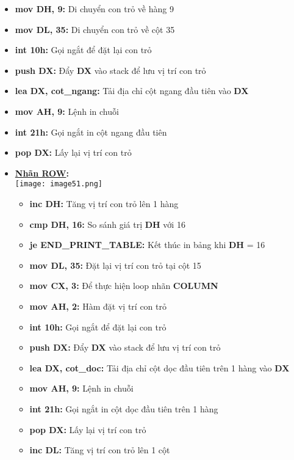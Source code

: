 \begin{itemize}
    \item \textbf{mov DH, 9:} Di chuyển con trỏ về hàng 9
    \item \textbf{mov DL, 35:} Di chuyển con trỏ về cột 35
    \item \textbf{int 10h:} Gọi ngắt để đặt lại con trỏ
    \item \textbf{push DX:} Đẩy \textbf{DX} vào stack để lưu vị trí con trỏ
    \item \textbf{lea DX, cot\_ngang:} Tải địa chỉ cột ngang đầu tiên vào \textbf{DX}
    \item \textbf{mov AH, 9:} Lệnh in chuỗi
    \item \textbf{int 21h:} Gọi ngắt in cột ngang đầu tiên
    \item \textbf{pop DX:} Lấy lại vị trí con trỏ
  
\item \textbf{\underline{Nhãn ROW}: }\\
    \texttt{[image: image51.png]}
    \begin{itemize}
        \item \textbf{inc DH:} Tăng vị trí con trỏ lên 1 hàng
        \item \textbf{cmp DH, 16:} So sánh giá trị \textbf{DH} với 16 
        \item \textbf{je END\_PRINT\_TABLE:} Kết thúc in bảng khi \textbf{DH} = 16
        \item \textbf{mov DL, 35:} Đặt lại vị trí con trỏ tại cột 15
        \item \textbf{mov CX, 3:} Để thực hiện loop nhãn \textbf{COLUMN}
        \item \textbf{mov AH, 2:} Hàm đặt vị trí con trỏ
        \item \textbf{int 10h:} Gọi ngắt để đặt lại con trỏ
        \item \textbf{push DX:} Đẩy \textbf{DX} vào stack để lưu vị trí con trỏ
        \item \textbf{lea DX, cot\_doc:} Tải địa chỉ cột dọc đầu tiên trên 1 hàng vào \textbf{DX} 
        \item \textbf{mov AH, 9:} Lệnh in chuỗi
        \item \textbf{int 21h:} Gọi ngắt in cột dọc đầu tiên trên 1 hàng
        \item \textbf{pop DX:} Lấy lại vị trí con trỏ
        \item \textbf{inc DL: }Tăng vị trí con trỏ lên 1 cột
    \end{itemize}


\end{itemize}
